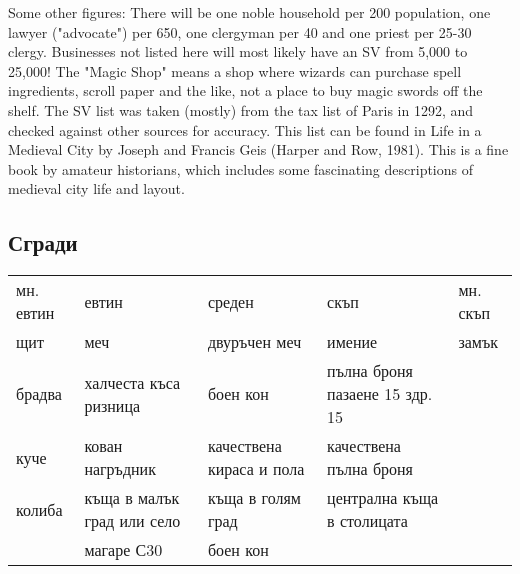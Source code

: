 Some other figures: There will be one noble household per 200 population, one lawyer ("advocate") per 650, one clergyman per 40 and one priest per 25-30 clergy. Businesses not listed here will most likely have an SV from 5,000 to 25,000! The "Magic Shop" means a shop where wizards can purchase spell ingredients, scroll paper and the like, not a place to buy magic swords off the shelf. The SV list was taken (mostly) from the tax list of Paris in 1292, and checked against other sources for accuracy. This list can be found in Life in a Medieval City by Joseph and Francis Geis (Harper and Row, 1981). This is a fine book by amateur historians, which includes some fascinating descriptions of medieval city life and layout. 

\subsection{Сгради}
\begin{tabular}{p{3cm} | p{3cm} | p{3cm} | p{3cm} | p{3cm}}
мн. евтин & евтин                                   & среден                   & скъп                           & мн. скъп  \\
щит       & меч                                     & двуръчен меч             & имение                         & замък     \\
брадва    & халчеста къса ризница                   & боен кон                 & пълна броня пазаене 15 здр. 15 &           \\
куче      & кован нагръдник                         & качествена кираса и пола & качествена пълна броня         &           \\
колиба    & къща в малък град или село              & къща в голям град        & централна къща в столицата                 \\
          & магаре С30                              & боен кон                 &
\end{tabular}

